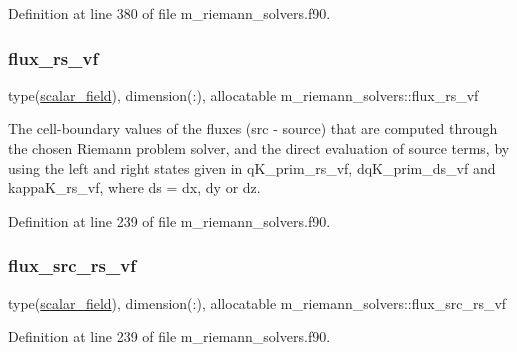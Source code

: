 Definition at line 380 of file m\+\_\+riemann\+\_\+solvers.\+f90.

\mbox{\label{namespacem__riemann__solvers_a3d8e1f9ad9ca68e97109e0cff7aa1c4b}} 
\subsubsection{\texorpdfstring{flux\+\_\+rs\+\_\+vf}{flux\_rs\_vf}}
{\footnotesize\ttfamily type(\hyperlink{structm__derived__types_1_1scalar__field}{scalar\+\_\+field}), dimension(\+:), allocatable m\+\_\+riemann\+\_\+solvers\+::flux\+\_\+rs\+\_\+vf}



The cell-\/boundary values of the fluxes (src -\/ source) that are computed through the chosen Riemann problem solver, and the direct evaluation of source terms, by using the left and right states given in q\+K\+\_\+prim\+\_\+rs\+\_\+vf, dq\+K\+\_\+prim\+\_\+ds\+\_\+vf and kappa\+K\+\_\+rs\+\_\+vf, where ds = dx, dy or dz. 



Definition at line 239 of file m\+\_\+riemann\+\_\+solvers.\+f90.

\mbox{\label{namespacem__riemann__solvers_a0b6d2f192a1df76abc59b85b03f7a187}} 
\subsubsection{\texorpdfstring{flux\+\_\+src\+\_\+rs\+\_\+vf}{flux\_src\_rs\_vf}}
{\footnotesize\ttfamily type(\hyperlink{structm__derived__types_1_1scalar__field}{scalar\+\_\+field}), dimension(\+:), allocatable m\+\_\+riemann\+\_\+solvers\+::flux\+\_\+src\+\_\+rs\+\_\+vf}



Definition at line 239 of file m\+\_\+riemann\+\_\+solvers.\+f90.

\mbox{\label{namespacem__riemann__solvers_adbaf70dfc178970c3e210dddedc31971}} 
